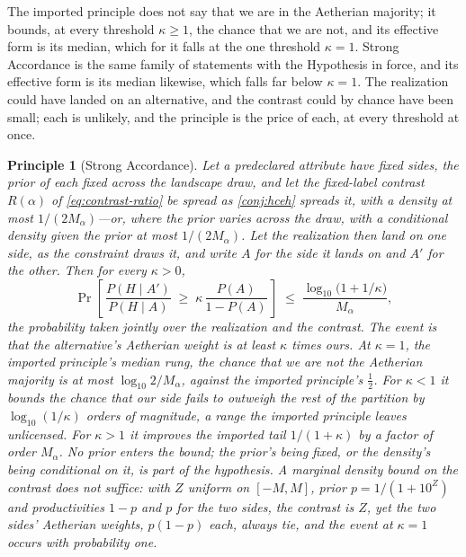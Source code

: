 \documentclass[11pt]{article}
\newtheorem{principle}{Principle}
\theoremstyle{definition}
\begin{document}
\noindent The imported principle does not say that we are in the Aetherian majority; it bounds, at every threshold $\kappa \ge 1$, the chance that we are not, and its effective form is its median, which for it falls at the one threshold $\kappa = 1$. Strong Accordance is the same family of statements with the Hypothesis in force, and its effective form is its median likewise, which falls far below $\kappa = 1$. The realization could have landed on an alternative, and the contrast could by chance have been small; each is unlikely, and the principle is the price of each, at every threshold at once.

\begin{principle}[Strong Accordance]
\label{prin:strong-full}
Let a predeclared attribute have fixed sides, the prior of each fixed across the landscape draw, and let the fixed-label contrast $R(\alpha)$ of \eqref{eq:contrast-ratio} be spread as \autoref{conj:hceh} spreads it, with a density at most $1/(2M_\alpha)$---or, where the prior varies across the draw, with a conditional density given the prior at most $1/(2M_\alpha)$. Let the realization then land on one side, as the constraint draws it, and write $A$ for the side it lands on and $A'$ for the other. Then for every $\kappa > 0$,
\begin{equation}
\label{eq:strong-full}
\Pr\!\left[\, \frac{P(H \mid A')}{P(H \mid A)} \;\ge\; \kappa\, \frac{P(A)}{1 - P(A)} \,\right] \;\le\; \frac{\log_{10}\!\big(1 + 1/\kappa\big)}{M_\alpha},
\end{equation}
the probability taken jointly over the realization and the contrast. The event is that the alternative's Aetherian weight is at least $\kappa$ times ours. At $\kappa = 1$, the imported principle's median rung, the chance that we are not the Aetherian majority is at most $\log_{10} 2 / M_\alpha$, against the imported principle's $\tfrac12$. For $\kappa < 1$ it bounds the chance that our side fails to outweigh the rest of the partition by $\log_{10}(1/\kappa)$ orders of magnitude, a range the imported principle leaves unlicensed. For $\kappa > 1$ it improves the imported tail $1/(1+\kappa)$ by a factor of order $M_\alpha$. No prior enters the bound; the prior's being fixed, or the density's being conditional on it, is part of the hypothesis. A marginal density bound on the contrast does not suffice: with $Z$ uniform on $[-M, M]$, prior $p = 1/(1 + 10^{Z})$ and productivities $1 - p$ and $p$ for the two sides, the contrast is $Z$, yet the two sides' Aetherian weights, $p(1-p)$ each, always tie, and the event at $\kappa = 1$ occurs with probability one.
\end{principle}
\end{document}
